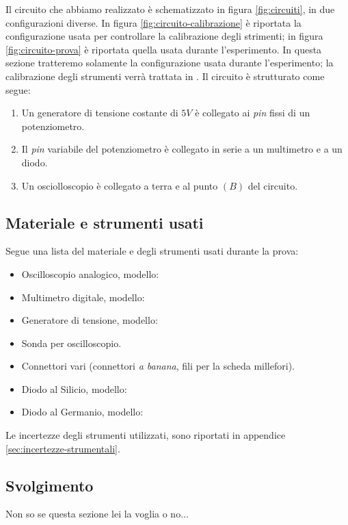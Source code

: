 \documentclass[11pt, a4paper, twoside]{article}
\begin{document}
    Il circuito che abbiamo realizzato è schematizzato in figura \ref{fig:circuiti}, in due configurazioni diverse. In figura \ref{fig:circuito-calibrazione}
    è riportata la configurazione usata per controllare la calibrazione degli strimenti; in figura \ref{fig:circuito-prova}
    è riportata quella usata durante l'esperimento. In questa sezione tratteremo solamente la configurazione usata durante l'esperimento;
    la calibrazione degli strumenti verrà trattata in %
    . Il circuito è strutturato come segue:
    \begin{enumerate}
      \item%
        Un generatore di tensione costante di $5V$ è collegato ai \emph{pin} fissi di un potenziometro.
      \item%
        Il \emph{pin} variabile del potenziometro è collegato in serie a un multimetro e a un diodo.
      \item%
        Un osciolloscopio è collegato a terra e al punto $(B)$ del circuito. 
    \end{enumerate}

  \subsection{Materiale e strumenti usati}\label{subsec:materiali}
    Segue una lista del materiale e degli strumenti usati durante la prova:
      \begin{itemize}
        \item%
          Oscilloscopio analogico, modello: %
        \item%
          Multimetro digitale, modello: %
        \item%
          Generatore di tensione, modello: %
        \item%
          Sonda per oscilloscopio.
        \item%
          Connettori vari (connettori \emph{a banana}, fili per la scheda millefori).
        \item%
          Diodo al Silicio, modello: %
        \item%
          Diodo al Germanio, modello: %
      \end{itemize}
    Le incertezze degli strumenti utilizzati, sono riportati in appendice \ref{sec:incertezze-strumentali}.

  \subsection{Svolgimento}\label{subsec:svolgimento}
  Non so se questa sezione lei la voglia o no...
\end{document}
